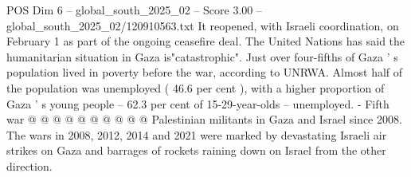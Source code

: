 \begin{textsample}{POS Dim 6 – global\_south\_2025\_02 – Score 3.00 – global\_south\_2025\_02/120910563.txt}
It reopened, with Israeli coordination, on February 1 as part of the ongoing ceasefire deal.
The United Nations has said the humanitarian situation in Gaza is"catastrophic".
Just over four-fifths of Gaza ' s population lived in poverty before the war, according to UNRWA.
Almost half of the population was unemployed ( 46.6 per cent ), with a higher proportion of Gaza ' s young people -- 62.3 per cent of 15-29-year-olds -- unemployed. - Fifth war @ @ @ @ @ @ @ @ @ @ Palestinian militants in Gaza and Israel since 2008.
The wars in 2008, 2012, 2014 and 2021 were marked by devastating Israeli air strikes on Gaza and barrages of rockets raining down on Israel from the other direction.

\end{textsample}
